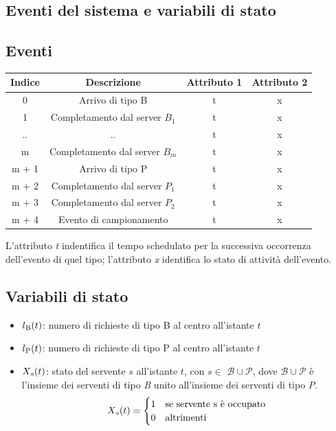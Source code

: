 \documentclass[a4paper, 12pt]{article}
\newcommand{\bup}[0]{$\mathcal{B} \cup \mathcal{P}$}
\begin{document}
\subsection{Eventi del sistema e variabili di stato}
\subsection{Eventi}
\begin{center}
\begin{tabular}{ |c|c|c|c| }
	\hline
    \cellcolor{cellcolor}Indice & \cellcolor{cellcolor}Descrizione & \cellcolor{cellcolor}Attributo 1 & \cellcolor{cellcolor}Attributo 2 \\
    \hline
    \hline
    0 & Arrivo di tipo B & t & x \\
    \hline
    1 & Completamento dal server $B_1$ & t & x \\
    \hline
    .. & .. & t & x \\
    \hline
    m & Completamento dal server $B_m$ & t & x \\
    \hline
    m + 1 & Arrivo di tipo P & t & x \\
    \hline
    m + 2 & Completamento dal server $P_1$ & t & x \\
    \hline
    m + 3 & Completamento dal server $P_2$ & t & x \\
    \hline
    m + 4 & Evento di campionamento & t & x \\
    \hline
\end{tabular}
\end{center}
L'attributo \emph{t} indentifica il tempo schedulato per la successiva occorrenza
dell'evento di quel tipo; l'attributo \emph{x} identifica lo stato di attività
dell'evento.

\subsection{Variabili di stato}
\begin{itemize}
  \item $l\textsubscript{B}(t)$: numero di richieste di tipo B al centro all'istante $t$
  \item $l\textsubscript{P}(t)$: numero di richieste di tipo P al centro all'istante $t$
  \item $X\textsubscript{s}(t)$: stato del servente $s$ all'istante $t$, 
  con $s \in$ \bup, dove \bup{} è l'insieme dei serventi di tipo \textit{B} unito all'insieme dei serventi di tipo \textit{P}.
  \[
      X\textsubscript{s}(t) = 
  \begin{cases}
      1& \text{se servente s è occupato}\\ 
      0              & \text{altrimenti}
  \end{cases}
  \]	
\end{itemize}
\end{document}
